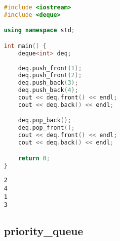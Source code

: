 \begin{table}[H]
	\centering
	\caption{deque操作}
\end{table}


\begin{lstlisting}[language=C++]
#include <iostream>
#include <deque>

using namespace std;

int main() {
	deque<int> deq;
	
	deq.push_front(1);
	deq.push_front(2);
	deq.push_back(3);
	deq.push_back(4);
	cout << deq.front() << endl;
	cout << deq.back() << endl;

	deq.pop_back();
	deq.pop_front();
	cout << deq.front() << endl;
	cout << deq.back() << endl;

	return 0;
}
\end{lstlisting}

\begin{tcolorbox}
	\begin{verbatim}
2
4
1
3
	\end{verbatim}
\end{tcolorbox}

\vspace{0.5cm}

\subsection{priority\_queue}

